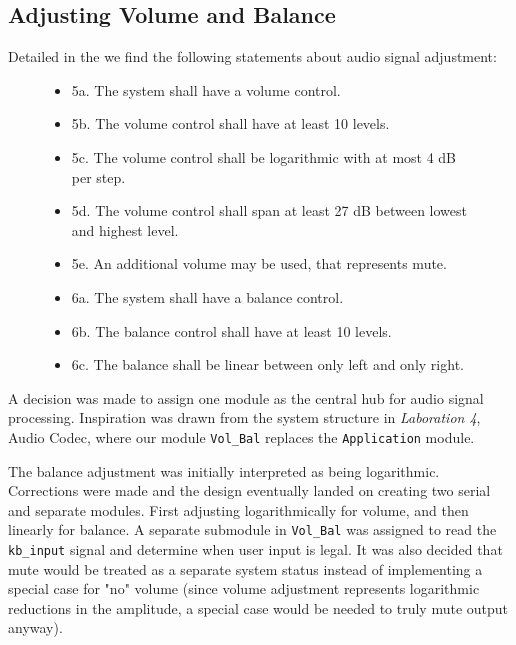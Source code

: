
\subsection{Adjusting Volume and Balance}

Detailed in the \citeR{} we find the following statements about audio signal adjustment:
	
\begin{figure}[h]
\centering
\begin{itemize}
\item 5a. The system shall have a volume control.
\item  5b. The volume control shall have at least 10 levels.
\item  5c. The volume control shall be logarithmic with at most 4 dB per step.
\item  5d. The volume control shall span at least 27 dB between lowest and highest level.
\item  5e. An additional volume may be used, that represents mute.
\item  6a. The system shall have a balance control.
\item  6b. The balance control shall have at least 10 levels.
\item  6c. The balance shall be linear between only left and only right.
\end{itemize}
\end{figure}
	
A decision was made to assign one module as the central hub for audio signal processing. Inspiration was drawn from the system structure in \emph{Laboration 4}, Audio Codec, where our module \texttt{Vol\_Bal} replaces the \texttt{Application} module.
	
The balance adjustment was initially interpreted as being logarithmic. Corrections were made and the design eventually landed on creating two serial and separate modules. First adjusting logarithmically for volume, and then linearly for balance.
A separate submodule in \texttt{Vol\_Bal} was assigned to read the \verb=kb_input= signal and determine when user input is legal.
It was also decided that mute would be treated as a separate system status instead of implementing a special case for "no" volume (since volume adjustment represents logarithmic reductions in the amplitude, a special case would be needed to truly mute output anyway).
	
